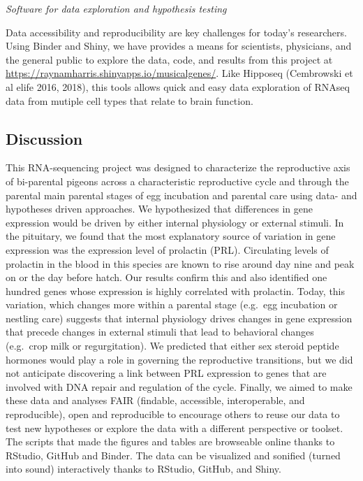 \emph{Software for data exploration and hypothesis testing}

Data accessibility and reproducibility are key challenges for today's
researchers. Using Binder and Shiny, we have provides a means for
scientists, physicians, and the general public to explore the data,
code, and results from this project at
\url{https://raynamharris.shinyapps.io/musicalgenes/}. Like Hipposeq
(Cembrowski et al elife 2016, 2018), this tools allows quick and easy
data exploration of RNAseq data from mutiple cell types that relate to
brain function.

\hypertarget{discussion}{%
\subsection{Discussion}\label{discussion}}

This RNA-sequencing project was designed to characterize the
reproductive axis of bi-parental pigeons across a characteristic
reproductive cycle and through the parental main parental stages of egg
incubation and parental care using data- and hypotheses driven
approaches. We hypothesized that differences in gene expression would be
driven by either internal physiology or external stimuli. In the
pituitary, we found that the most explanatory source of variation in
gene expression was the expression level of prolactin (PRL). Circulating
levels of prolactin in the blood in this species are known to rise
around day nine and peak on or the day before hatch. Our results confirm
this and also identified one hundred genes whose expression is highly
correlated with prolactin. Today, this variation, which changes more
within a parental stage (e.g.~egg incubation or nestling care) suggests
that internal physiology drives changes in gene expression that precede
changes in external stimuli that lead to behavioral changes (e.g.~crop
milk or regurgitation). We predicted that either sex steroid peptide
hormones would play a role in governing the reproductive transitions,
but we did not anticipate discovering a link between PRL expression to
genes that are involved with DNA repair and regulation of the cycle.
Finally, we aimed to make these data and analyses FAIR (findable,
accessible, interoperable, and reproducible), open and reproducible to
encourage others to reuse our data to test new hypotheses or explore the
data with a different perspective or toolset. The scripts that made the
figures and tables are browseable online thanks to RStudio, GitHub and
Binder. The data can be visualized and sonified (turned into sound)
interactively thanks to RStudio, GitHub, and Shiny.

